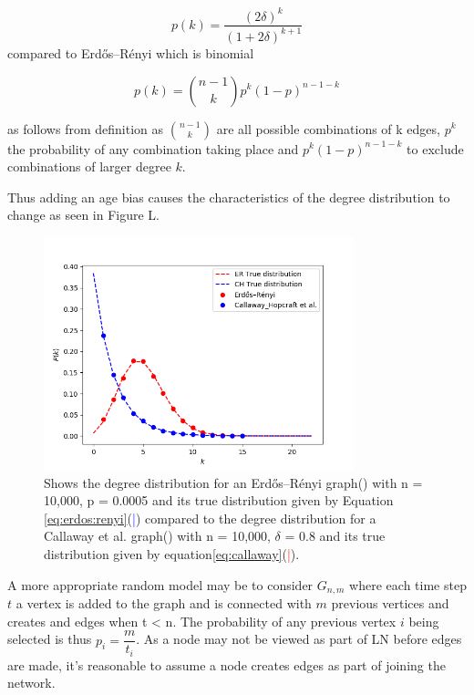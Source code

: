 \begin{equation}
	p(k) = \dfrac{(2\delta)^k}{(1 + 2\delta)^{k+1}} 
	\label{eq:callaway}
\end{equation}
compared to Erdős–Rényi which is binomial

\begin{equation}
	p(k) = {n-1 \choose k} p^k(1-p)^{n-1-k} 
	\label{eq:erdos:renyi}
\end{equation}

as follows from definition as ${n-1 \choose k}$ are all possible combinations of k edges,  $p^k$ the probability of any combination taking place and $p^k(1-p)^{n-1-k}$ to exclude combinations of larger degree $k$.

Thus adding an age bias causes the characteristics of the degree distribution to change as seen in Figure L.

\begin{figure}[!htb]
		\hspace*{-0.5cm} 
	\centering
	\includegraphics[width=9cm]{images/random_topology_degree_distribution.png}
	\caption{Shows the degree distribution for an Erdős–Rényi graph(\tikzcircle[blue, fill=blue]{2pt}) with n = 10,000, p = 0.0005 and its true distribution given by Equation \ref{eq:erdos:renyi}(\textcolor{blue}{|}) compared to the degree distribution for a Callaway et al. graph(\tikzcircle[red, fill=red]{2pt})  with n = 10,000, $\delta$ = 0.8 and its true distribution given by equation\ref{eq:callaway}(\textcolor{red}{|}).
	}
	\label{fig:fee_curve}
		\hspace*{2mm} 
\end{figure}

A more appropriate random model may be to consider $G_{n,m}$ where each time step $t$ a vertex is added to the graph and is connected with $m$ previous vertices and creates and edges when t < n. The probability of any previous vertex $i$ being selected is thus $p_i = \dfrac{m}{t_i}$. 
As a node may not be viewed as part of LN before edges are made, it's reasonable to assume a node creates edges as part of joining the network.

